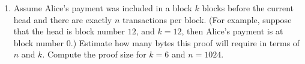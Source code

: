 \documentclass[11pt]{article}
\newenvironment{problems}
{\begin{enumerate}[label=\bfseries Problem \arabic*.,align=left,leftmargin=1em,labelwidth=1.5em]}
{\end{enumerate}}
\newenvironment{subparts}
{\begin{enumerate}[label=\bfseries \alph*.,align=right,leftmargin=1.5em]}
{\end{enumerate}}
\begin{document}
\begin{problems}
\begin{subparts}
\item Assume Alice’s payment was included in a block $k$ blocks before
  the current head and there are exactly $n$ transactions per block. (For example, suppose that the head is block number $12$, and $k=12$, then Alice's payment is at block number $0$.) Estimate
  how many bytes this proof will require in terms of $n$ and $k$.
  Compute the proof size for $k=6$ and $n=1024$.

\end{subparts}

\end{problems}
\end{document}
